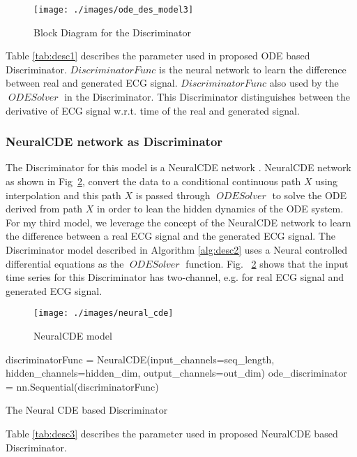 \documentclass{article}
\DeclareMathOperator{\ODESOLVER}{\textit{ODESolver}}
\begin{document}
\begin{figure}
    \centering
    \texttt{[image: ./images/ode\_des\_model3]}
    \caption{Block Diagram for the Discriminator}
    \label{fig:ode_des_model3}
\end{figure}

Table \ref{tab:desc1} describes the parameter used in proposed ODE based Discriminator. $DiscriminatorFunc$ is the neural network to learn the difference between real and generated ECG signal. $DiscriminatorFunc$ also used by the $\ODESOLVER$ in the Discriminator. This Discriminator distinguishes between the derivative of ECG signal w.r.t. time of the real and generated signal.

\subsubsection{NeuralCDE network as Discriminator}
The Discriminator for this model is a NeuralCDE network  \cite{kidger2020neural}. NeuralCDE network as shown in Fig~\ref{fig:neural_cde}, convert the data to a conditional continuous path $X$ using interpolation and this path $X$ is passed through $\ODESOLVER$ to solve the ODE derived from path $X$ in order to lean the hidden dynamics of the ODE system. For my third model, we leverage the concept of the NeuralCDE network to learn the difference between a real ECG signal and the generated ECG signal. The Discriminator model described in Algorithm \ref{alg:desc2} uses a Neural controlled differential equations \cite{kidger2020neural} as the $\ODESOLVER$ function. Fig. ~\ref{fig:neural_cde} shows that the input time series for this Discriminator has two-channel, e.g. for real ECG signal and generated ECG signal.

\begin{figure}[!htb]
    \centering
    \texttt{[image: ./images/neural\_cde]}
    \caption{NeuralCDE model \cite{kidger2020neural}}
    \label{fig:neural_cde}
\end{figure}


\begin{algorithm}[htb]
	\label{alg:desc2}
	discriminatorFunc = NeuralCDE(input\_channels=seq\_length, hidden\_channels=hidden\_dim, output\_channels=out\_dim)
	ode\_discriminator = nn.Sequential(discriminatorFunc)
	\caption{The Neural CDE based Discriminator}
\end{algorithm} 

Table \ref{tab:desc3} describes the parameter used in proposed NeuralCDE based Discriminator.
\end{document}

